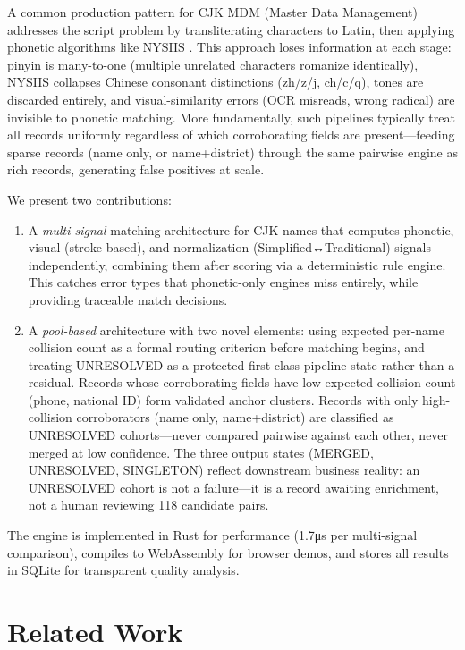 \documentclass{article}
\begin{document}
A common production pattern for CJK MDM (Master Data Management) addresses the script problem by transliterating characters to Latin, then applying phonetic algorithms like NYSIIS \cite{taft1970name}. This approach loses information at each stage: pinyin is many-to-one (multiple unrelated characters romanize identically), NYSIIS collapses Chinese consonant distinctions (zh/z/j, ch/c/q), tones are discarded entirely, and visual-similarity errors (OCR misreads, wrong radical) are invisible to phonetic matching. More fundamentally, such pipelines typically treat all records uniformly regardless of which corroborating fields are present—feeding sparse records (name only, or name+district) through the same pairwise engine as rich records, generating false positives at scale.

We present two contributions:

\begin{enumerate}
\tightlist
\item A \emph{multi-signal} matching architecture for CJK names that computes phonetic, visual (stroke-based), and normalization (Simplified↔Traditional) signals independently, combining them after scoring via a deterministic rule engine. This catches error types that phonetic-only engines miss entirely, while providing traceable match decisions.
\item A \emph{pool-based} architecture with two novel elements: using expected per-name collision count as a formal routing criterion before matching begins, and treating UNRESOLVED as a protected first-class pipeline state rather than a residual. Records whose corroborating fields have low expected collision count (phone, national ID) form validated anchor clusters. Records with only high-collision corroborators (name only, name+district) are classified as UNRESOLVED cohorts—never compared pairwise against each other, never merged at low confidence. The three output states (MERGED, UNRESOLVED, SINGLETON) reflect downstream business reality: an UNRESOLVED cohort is not a failure—it is a record awaiting enrichment, not a human reviewing 118 candidate pairs.
\end{enumerate}

The engine is implemented in Rust for performance (1.7μs per multi-signal comparison), compiles to WebAssembly for browser demos, and stores all results in SQLite for transparent quality analysis.

\section{Related Work}\label{sec:related}
\end{document}
